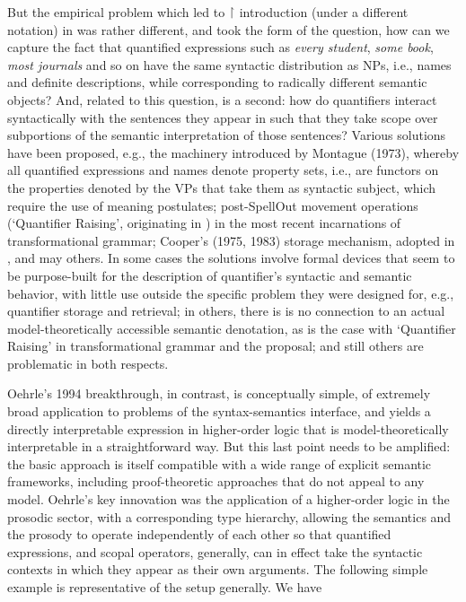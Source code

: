 \documentclass[output=paper,colorlinks,citecolor=brown]{langscibook}
\begin{document}
But the empirical problem which led to \ensuremath{\vs} introduction (under a different
notation) in \citet{oehrle1994} was rather different, and took the form of
the question, how can we capture the fact that quantified expressions
such as \textit{every student}, \textit{some book}, \textit{most journals} and so on have
the same syntactic distribution as NPs, i.e., names and definite
descriptions, while corresponding to radically different semantic
objects? And, related to this question, is a second: how do
quantifiers interact syntactically with the sentences they appear in
such that they take scope over subportions of the semantic
interpretation of those sentences? Various solutions have been
proposed, e.g., the machinery introduced by Montague
(1973)\nocite{montague1973a}, whereby all quantified expressions and
names denote property sets, i.e., are functors on the properties
denoted by the VPs that take them as syntactic subject, which require
the use of meaning postulates; post-SpellOut
movement operations (`Quantifier Raising', originating in
\citet{may_r1985a}) in the most recent incarnations of transformational
grammar; Cooper's (1975, 1983)\nocite{cooper75}\nocite{Cooper83}
storage mechanism, adopted in \citet{pollardsag94}, and may others. In
some cases the solutions involve formal devices that seem to be
purpose-built for the description of quantifier's syntactic and
semantic behavior, with little use outside the specific problem they
were designed for, e.g., quantifier storage and retrieval; in others,
there is is no connection to an actual model-theoretically accessible
semantic denotation, as is the case with `Quantifier Raising' in
transformational grammar and the \citet{pollardsag94} proposal; and still
others are problematic in both respects.

Oehrle's 1994 breakthrough, in contrast, is conceptually simple, of
extremely broad application to problems of the syntax-semantics
interface, and yields a directly interpretable expression in
higher-order logic that is model-theoretically interpretable in a
straightforward way. But this last point needs to be amplified: the
basic approach is itself compatible with a wide range of explicit
semantic frameworks, including proof-theoretic approaches that do not
appeal to any model. Oehrle's key innovation was the application of a
higher-order logic in the prosodic sector, with a corresponding type
hierarchy, allowing the semantics and the prosody to operate
independently of each other so that quantified expressions, and scopal
operators, generally, can in effect take the syntactic contexts in
which they appear as their own arguments. The following simple example
is representative of the setup generally. We have
\end{document}
